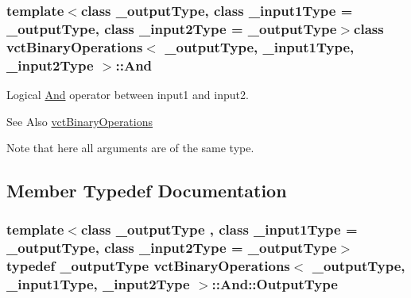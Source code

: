 \subsubsection*{template$<$class \-\_\-output\-Type, class \-\_\-input1\-Type = \-\_\-output\-Type, class \-\_\-input2\-Type = \-\_\-output\-Type$>$class vct\-Binary\-Operations$<$ \-\_\-output\-Type, \-\_\-input1\-Type, \-\_\-input2\-Type $>$\-::\-And}

Logical \hyperlink{classvct_binary_operations_1_1_and}{And} operator between input1 and input2. 

\begin{DoxySeeAlso}{See Also}
\hyperlink{classvct_binary_operations}{vct\-Binary\-Operations}
\end{DoxySeeAlso}
Note that here all arguments are of the same type. 

\subsection{Member Typedef Documentation}
\hypertarget{classvct_binary_operations_1_1_and_a266e94b9b9630c9e1f7527e5083c1384}{
\subsubsection[{Output\-Type}]{\setlength{\rightskip}{0pt plus 5cm}template$<$class \-\_\-output\-Type , class \-\_\-input1\-Type  = \-\_\-output\-Type, class \-\_\-input2\-Type  = \-\_\-output\-Type$>$ typedef \-\_\-output\-Type {\bf vct\-Binary\-Operations}$<$ \-\_\-output\-Type, \-\_\-input1\-Type, \-\_\-input2\-Type $>$\-::{\bf And\-::\-Output\-Type}}}\label{classvct_binary_operations_1_1_and_a266e94b9b9630c9e1f7527e5083c1384}


